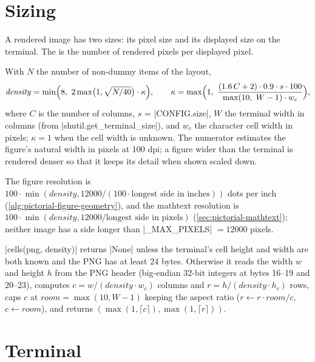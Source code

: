 {\section{Sizing}\label{sec:pictorial-sizing}

A rendered image has two sizes: its pixel size and its displayed size on the terminal. The
 is the number of rendered pixels per displayed pixel.

\begin{definition}\label{def:pictorial-density}
With $N$ the number of non-dummy items of the layout,
\[
  \mathit{density} = \min\Bigl(8,\ 2\max\bigl(1, \sqrt{N/40}\bigr)\cdot \kappa\Bigr),\qquad
  \kappa = \max\Bigl(1,\ \frac{(1.6\,C + 2)\cdot0.9\cdot s\cdot100}{\max(10,\ W-1)\cdot w_c}\Bigr),
\]
where $C$ is the number of columns, $s$ = \py|CONFIG.size|, $W$ the terminal width in columns
(from \py|shutil.get_terminal_size|), and $w_c$ the character cell width in pixels;
$\kappa = 1$ when the cell width is unknown. The numerator estimates the figure's natural width
in pixels at 100 dpi; a figure wider than the terminal is rendered denser so that it keeps its
detail when shown scaled down.
\end{definition}

The figure resolution is $100\cdot\min(\mathit{density}, 12000/(100\cdot\text{longest side in
inches}))$ dots per inch (\cref{alg:pictorial-figure-geometry}), and the mathtext resolution is
$100\cdot\min(\mathit{density}, 12000/\text{longest side in pixels})$
(\cref{sec:pictorial-mathtext}); neither image has a side longer than
\py|_MAX_PIXELS| $= 12000$ pixels.

\begin{definition}\label{def:pictorial-cells}
\py|cells(png, density)| returns \py|None| unless the terminal's cell height and width are both
known and the PNG has at least 24 bytes. Otherwise it reads the width $w$ and height $h$ from the
PNG header (big-endian 32-bit integers at bytes 16--19 and 20--23), computes
$c = w/(\mathit{density}\cdot w_c)$ columns and $r = h/(\mathit{density}\cdot h_c)$ rows, caps
$c$ at $\mathit{room} = \max(10, W-1)$ keeping the aspect ratio ($r \gets r\cdot\mathit{room}/c$,
$c\gets\mathit{room}$), and returns $(\max(1,\lceil c\rceil), \max(1,\lceil r\rceil))$.
\end{definition}

\section{Terminal}\label{sec:pictorial-terminal}

}
